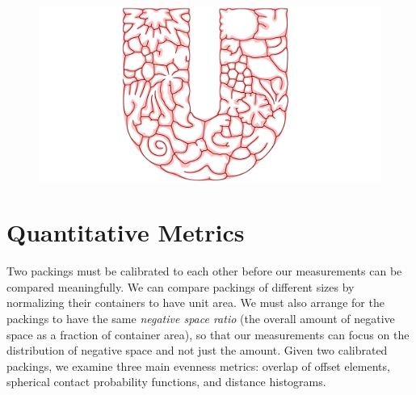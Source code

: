 

\begin{figure}[t]
\centering
\includegraphics[width=1.0\textwidth]{figures/metrics/unilever_with_skeleton.pdf}
\caption[An example of a skeleton of negative space]
{\label{fig_skeleton}
  }
\end{figure}

\section{Quantitative Metrics}

\newtext
{
Two packings must be calibrated to each other before our measurements 
can be compared meaningfully.  
We can compare packings of different sizes by normalizing their containers to
have unit area.  We must also arrange for the packings to have the same
} %
\textit{negative space ratio} 
 \newtext
{(the overall amount of negative space as a 
fraction of container area), so that our measurements can focus on the
distribution of negative space and not just the amount.  Given two
calibrated packings, we examine three main evenness metrics:
overlap of offset elements, spherical contact probability functions,
and distance histograms. %
}

